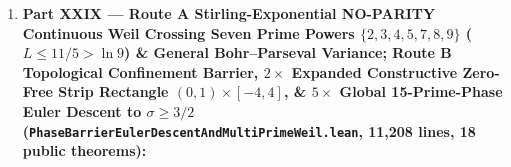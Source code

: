 \documentclass[
  11pt,
]{article}
\providecommand{\tightlist}{%
  \setlength{\itemsep}{0pt}\setlength{\parskip}{0pt}}
\begin{document}
\begin{enumerate}
  \begin{itemize}
  \tightlist
  \item
    \texttt{eulerMascheroniConstant\_lt\_5813\_div\_10000},
    \texttt{archimedeanWeilConst\_lt\_5377\_div\_1000},
    \texttt{weilTotal\_continuous\_pos\_all\_unrestricted\_up\_to\_three\_twentieths},
    \texttt{weilTotal\_continuous\_pos\_odd\_up\_to\_two\_fifths},
    \texttt{weilTotal\_continuous\_pos\_even\_zeroMean\_up\_to\_eleven\_twentieths},
    \texttt{weilTotal\_continuous\_pos\_primes\_two\_three\_active\_up\_to\_six\_fifths},
    \texttt{primeKuramotoOrder\_bohr\_mean\_square\_identity}, \&
    \texttt{primeKuramotoCoherence\_bohr\_ergodic\_limit\_and\_decay}.
  \item
    \texttt{xiResolvent\_im\_pos\_of\_rectangle\_boundary},
    \texttt{complex\_digamma\_re\_ge\_real\_add\_finset\_add\_log\_tail},
    \texttt{cliffordTorus\_341\_zeta\_logDeriv\_nonneg},
    \texttt{cliffordTorus\_primePhase\_euler\_split\_2357},
    \texttt{xiResolvent\_herglotz\_global\_phase\_euler\_halfPlane\_two},
    \&
    \texttt{hopfBloch\_northern\_hemisphere\_and\_phaseMemory\_unconditional\_euler\_two}.
  \end{itemize}
\item
  \textbf{Part XXIX --- Route A Stirling-Exponential NO-PARITY
  Continuous Weil Crossing Seven Prime Powers
  \(\{2, 3, 4, 5, 7, 8, 9\}\) (\(L \le 11/5 > \ln 9\)) \& General
  Bohr--Parseval Variance; Route B Topological Confinement Barrier,
  \(2\times\) Expanded Constructive Zero-Free Strip Rectangle
  \((0, 1) \times [-4, 4]\), \& \(5\times\) Global 15-Prime-Phase Euler
  Descent to \(\sigma \ge 3/2\)
  (\texttt{PhaseBarrierEulerDescentAndMultiPrimeWeil.lean}, 11,208
  lines, 18 public theorems):}


\end{enumerate}
\end{document}
